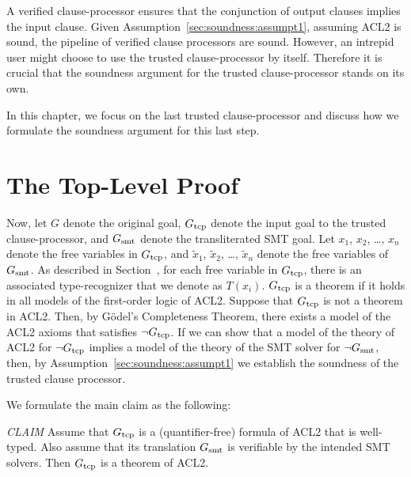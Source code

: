 A verified clause-processor ensures that the conjunction of output clauses
implies the input clause.
Given Assumption~\ref{sec:soundness:assumpt1}, assuming ACL2 is sound, the
pipeline of verified clause processors are sound.
However, an intrepid user might choose to use the trusted clause-processor by
itself. Therefore it is crucial that the soundness argument for the trusted 
clause-processor stands on its own.

In this chapter, we focus on the last trusted clause-processor and discuss how
we formulate the soundness argument for this last step.


\section{The Top-Level Proof}
Now, let $G$ denote the original goal, $G_{\mathrm{tcp}}$ denote the input goal to the
trusted clause-processor, and $G_{\mathrm{smt}}$ denote the transliterated \acs{SMT} goal.
Let $x_1$, $x_2$, \ldots, $x_n$ denote the free variables in $G_{\mathrm{tcp}}$, and
$\tilde{x}_1$, $\tilde{x}_2$, \ldots, $\tilde{x}_n$ denote the free variables of
$G_{\mathrm{smt}}$.
As described in Section~\label{sec:soundness:assumpt}, for each free variable in
$G_{\mathrm{tcp}}$, there is an associated type-recognizer that we denote as $T(x_i)$.
$G_{\mathrm{tcp}}$ is a theorem if it holds in all models of the first-order logic of ACL2.
Suppose that $G_{\mathrm{tcp}}$ is not a theorem in ACL2.  Then, by G\"{o}del's
Completeness Theorem, there exists a model of the ACL2 axioms that satisfies
$\neg G_{\mathrm{tcp}}$.
If we can show that a model of the theory of ACL2 for $\neg G_{\mathrm{tcp}}$ implies a
model of the theory of the SMT solver for $\neg G_{\mathrm{smt}}$, then, by
Assumption~\ref{sec:soundness:assumpt1} we establish the soundness of the
trusted clause processor. 

We formulate the main claim as the following:

\emph{CLAIM} Assume that $G_{\mathrm{tcp}}$ is a (quantifier-free) formula of ACL2 that is
   well-typed.  Also assume that its translation $G_{\mathrm{smt}}$ is verifiable by
   the intended SMT solvers.  Then $G_{\mathrm{tcp}}$ is a theorem of ACL2.
\\

